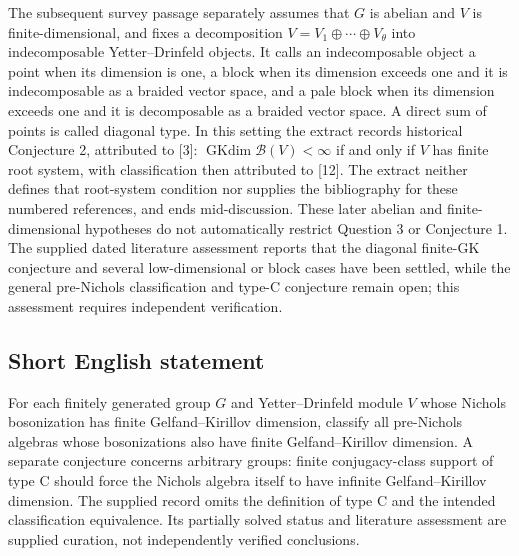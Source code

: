 \documentclass[11pt]{article}
\begin{document}
The subsequent survey passage separately assumes that \(G\) is abelian and \(V\) is finite-dimensional, and fixes a decomposition \(V=V_1\oplus\cdots\oplus V_\theta\) into indecomposable Yetter--Drinfeld objects. It calls an indecomposable object a point when its dimension is one, a block when its dimension exceeds one and it is indecomposable as a braided vector space, and a pale block when its dimension exceeds one and it is decomposable as a braided vector space. A direct sum of points is called diagonal type. In this setting the extract records historical Conjecture 2, attributed to [3]: \(\operatorname{GKdim}\mathcal B(V)<\infty\) if and only if \(V\) has finite root system, with classification then attributed to [12]. The extract neither defines that root-system condition nor supplies the bibliography for these numbered references, and ends mid-discussion. These later abelian and finite-dimensional hypotheses do not automatically restrict Question 3 or Conjecture 1. The supplied dated literature assessment reports that the diagonal finite-GK conjecture and several low-dimensional or block cases have been settled, while the general pre-Nichols classification and type-C conjecture remain open; this assessment requires independent verification.
\subsection{Short English statement}
For each finitely generated group \(G\) and Yetter--Drinfeld module \(V\) whose Nichols bosonization has finite Gelfand--Kirillov dimension, classify all pre-Nichols algebras whose bosonizations also have finite Gelfand--Kirillov dimension. A separate conjecture concerns arbitrary groups: finite conjugacy-class support of type C should force the Nichols algebra itself to have infinite Gelfand--Kirillov dimension. The supplied record omits the definition of type C and the intended classification equivalence. Its partially solved status and literature assessment are supplied curation, not independently verified conclusions.
\end{document}
